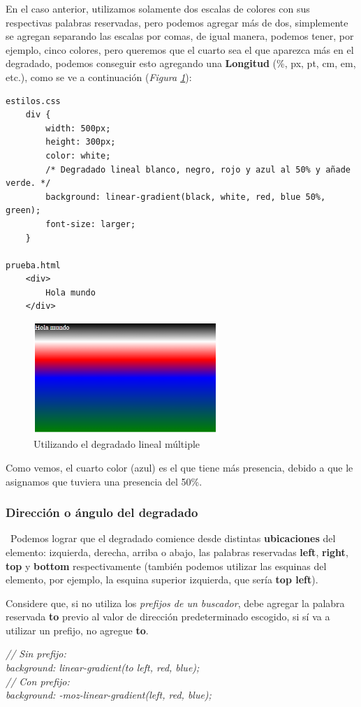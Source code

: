 En el caso anterior, utilizamos solamente dos escalas de colores con sus respectivas palabras reservadas, pero podemos agregar más de dos, simplemente se agregan separando las escalas por comas, de igual manera, podemos tener, por ejemplo, cinco colores, pero queremos que el cuarto sea el que aparezca más en el degradado, podemos conseguir esto agregando una \textbf{Longitud} (\%, px, pt, cm, em, etc.), como se ve a continuación (\textit{Figura \ref{fig: 43}}):
\begin{lstlisting}
estilos.css
    div {
        width: 500px; 
        height: 300px;
        color: white;
        /* Degradado lineal blanco, negro, rojo y azul al 50% y añade verde. */
        background: linear-gradient(black, white, red, blue 50%, green);
        font-size: larger;
    }

prueba.html
    <div>
        Hola mundo
    </div>
\end{lstlisting}
\begin{figure}[H]
    \centering
    \caption{Utilizando el degradado lineal múltiple}
    \label{fig: 43}
    \includegraphics[width=7cm]{ss/linear-gradient-2.png}
\end{figure}

Como vemos, el cuarto color (azul) es el que tiene más presencia, debido a que le asignamos que tuviera una presencia del 50\%.


\subsubsection{Dirección o ángulo del degradado}
\
Podemos lograr que el degradado comience desde distintas \textbf{ubicaciones} del elemento: izquierda, derecha, arriba o abajo, las palabras reservadas \textbf{left}, \textbf{right}, \textbf{top} y \textbf{bottom} respectivamente (también podemos utilizar las esquinas del elemento, por ejemplo, la esquina superior izquierda, que sería \textbf{top left}). 

Considere que, si no utiliza los \textit{prefijos de un buscador}, debe agregar la palabra reservada \textbf{to} previo al valor de dirección predeterminado escogido, si sí va a utilizar un prefijo, no agregue \textbf{to}.
\begin{center}
    \textit{
        // Sin prefijo: \\
        background: linear-gradient(to left, red, blue); \\
        // Con prefijo: \\
        background: -moz-linear-gradient(left, red, blue);
    }
\end{center}

